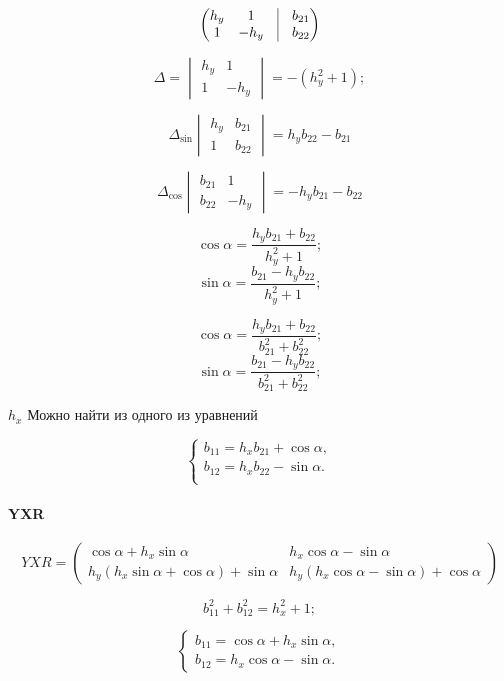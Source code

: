 $$\begin{pmatrix}
	h_y & 1 & \vrule & b_{21} \\
	1 & -h_y & \vrule  & b_{22}
\end{pmatrix}$$

$$\Delta = \begin{vmatrix}
	h_y & 1\\
	1 & -h_y
\end{vmatrix} = - (h_y^2 + 1);$$

$$\Delta_{\sin}\begin{vmatrix}
	h_y & b_{21}\\
	1 &   b_{22}
\end{vmatrix} = h_y b_{22} - b_{21}$$

$$\Delta_{\cos}\begin{vmatrix}
	b_{21} & 1\\
	b_{22} & -h_y
\end{vmatrix} = -h_y b_{21} - b_{22}$$

$$\cos\alpha = \frac{h_y b_{21} + b_{22}}{h_y^2 + 1};$$
$$\sin\alpha = \frac{b_{21} - h_y b_{22}}{h_y^2 + 1};$$

$$\cos\alpha = \frac{h_y b_{21} + b_{22}}{b_{21}^2 + b_{22}^2};$$
$$\sin\alpha = \frac{b_{21} - h_y b_{22}}{b_{21}^2 + b_{22}^2};$$


$h_x$ Можно найти из одного из уравнений

$$
\begin{cases}
	b_{11} = {h_x} b_{21} + \cos{\alpha},\\
	b_{12} = {h_x} b_{22} - \sin{\alpha}.\\
\end{cases}
$$

\paragraph{YXR}

$$YXR = \begin{pmatrix}
	\cos\alpha + {h_x} \sin\alpha & 
	{h_x} \cos\alpha -\sin\alpha \\
	{h_y}\left( {h_x}\sin\alpha + \cos\alpha\right)  +\sin\alpha & 
	{h_y}\left( {h_x}\cos\alpha - \sin\alpha\right)  +\cos\alpha
\end{pmatrix}$$

$$b_{11}^2 + b_{12}^2 = h_x^2 + 1;$$


$$
\begin{cases}
	b_{11} = \cos\alpha + {h_x} \sin\alpha,\\
	b_{12} = h_x \cos\alpha - \sin{\alpha}.
\end{cases}
$$


